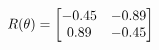 \documentclass[preview]{standalone}
\begin{document}
\begin{align*}
\special{dvisvgm:raw <g id='unique000'>}R(\theta) = \begin{bmatrix}-0.45 & -0.89\\0.89 & -0.45\end{bmatrix}\special{dvisvgm:raw </g>}
\end{align*}
\end{document}
